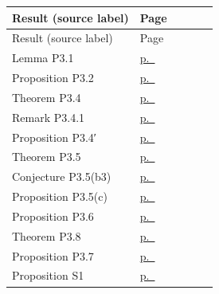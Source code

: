 \begin{center}\footnotesize
\begin{longtable}{@{}L{0.62\linewidth}l@{}}
\toprule Result (source label) & Page \\ \midrule\endfirsthead
\toprule Result (source label) & Page \\ \midrule\endhead
Lemma P3.1 & \hyperref[pE-res-lemma-P3.1]{p.~\pageref{pE-res-lemma-P3.1}} \\
Proposition P3.2 & \hyperref[pE-res-proposition-P3.2]{p.~\pageref{pE-res-proposition-P3.2}} \\
Theorem P3.4 & \hyperref[pE-res-theorem-P3.4]{p.~\pageref{pE-res-theorem-P3.4}} \\
Remark P3.4.1 & \hyperref[pE-res-remark-P3.4.1]{p.~\pageref{pE-res-remark-P3.4.1}} \\
Proposition P3.4′ & \hyperref[pE-res-proposition-P3.4p]{p.~\pageref{pE-res-proposition-P3.4p}} \\
Theorem P3.5 & \hyperref[pE-res-theorem-P3.5]{p.~\pageref{pE-res-theorem-P3.5}} \\
Conjecture P3.5(b3) & \hyperref[pE-res-conjecture-P3.5-b3]{p.~\pageref{pE-res-conjecture-P3.5-b3}} \\
Proposition P3.5(c) & \hyperref[pE-res-proposition-P3.5-c]{p.~\pageref{pE-res-proposition-P3.5-c}} \\
Proposition P3.6 & \hyperref[pE-res-proposition-P3.6]{p.~\pageref{pE-res-proposition-P3.6}} \\
Theorem P3.8 & \hyperref[pE-res-theorem-P3.8]{p.~\pageref{pE-res-theorem-P3.8}} \\
Proposition P3.7 & \hyperref[pE-res-proposition-P3.7]{p.~\pageref{pE-res-proposition-P3.7}} \\
Proposition S1 & \hyperref[pE-res-proposition-S1]{p.~\pageref{pE-res-proposition-S1}} \\
\bottomrule
\end{longtable}
\end{center}
